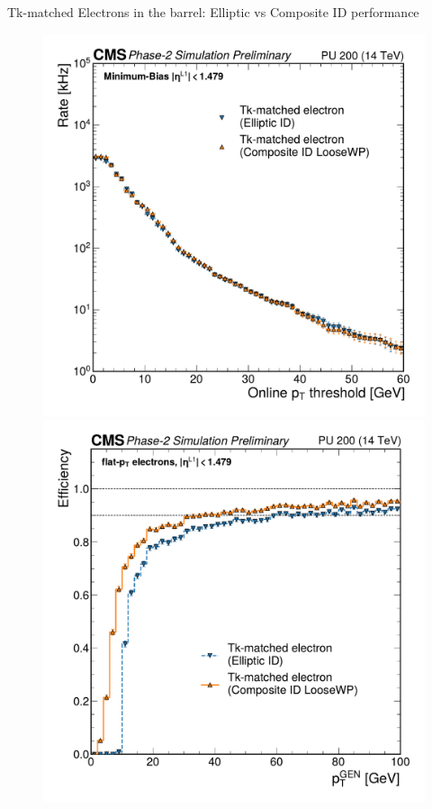 \documentclass[aspectratio=169]{beamer}\usepackage[utf8]{inputenc}
\begin{document}
\begin{frame}{Tk-matched Electrons in the barrel: Elliptic vs Composite ID performance}
\begin{figure}
\centering
    \includegraphics[height=0.475\textheight,trim={0 2cm 0 2.2cm}]{barrel_figs/slides21/rate.pdf}
    \includegraphics[height=0.475\textheight,trim={0 2cm 0 2.2cm}]{barrel_figs/slides21/pteff.pdf}


\end{figure}
\end{frame}
\end{document}
